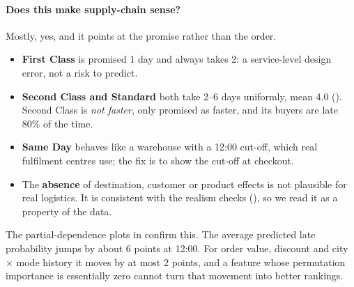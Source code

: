 \paragraph{Does this make supply-chain sense?} Mostly, yes, and it points at the promise rather
than the order.
\begin{itemize}
  \item \textbf{First Class} is promised 1 day and always takes 2: a service-level design error,
        not a risk to predict.
  \item \textbf{Second Class and Standard} both take 2--6 days uniformly, mean 4.0
        (). Second Class is \emph{not faster}, only promised as faster, and
        its buyers are late 80\% of the time.
  \item \textbf{Same Day} behaves like a warehouse with a 12:00 cut-off, which real fulfilment
        centres use; the fix is to show the cut-off at checkout.
  \item The \textbf{absence} of destination, customer or product effects is not plausible for
        real logistics. It is consistent with the realism checks (), so we
        read it as a property of the data.
\end{itemize}
The partial-dependence plots in  confirm this. The average predicted late
probability jumps by about 6 points at 12:00. For order value, discount and city $\times$ mode
history it moves by at most 2 points, and a feature whose permutation importance is
essentially zero cannot turn that movement into better rankings.
